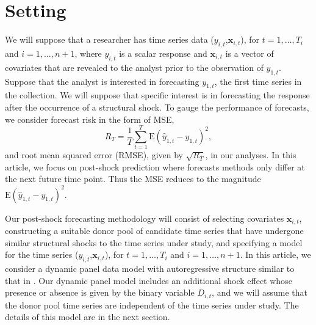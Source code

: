 \documentclass[11pt]{article}
\newcommand{\x}{\textbf{x}}
\def\E#1{\mathrm{E}(#1)} %
\theoremstyle{definition}
\begin{document}
\section{Setting}
\label{setting}

We will suppose that a researcher has time series data ($y_{i,t}$,$\x_{i,t}$), for $t = 1, \ldots,  T_i$ and $i = 1, \ldots, n+1$, where $y_{i,t}$ is a scalar response and $\x_{i,t}$ is a vector of covariates that are revealed to the analyst prior to the observation of $y_{1,t}$.  Suppose that the analyst is interested in forecasting $y_{1,t}$, the first time series in the collection. We will suppose that specific interest is in forecasting the response after the occurrence of a structural shock. To gauge the performance of forecasts, we consider forecast risk in the form of MSE,
$$
  R_T = \frac{1}{T}\sum_{t=1}^T\E{\hat y_{1,t} - y_{1,t}}^2,
$$
and root mean squared error (RMSE), given by $\sqrt{R_T}$, in our analyses. In this article, we focus on post-shock prediction where forecasts methods only differ at the next future time point. Thus the MSE reduces to the magnitude $\E{\hat y_{1,t} - y_{1,t}}^2$.


Our post-shock forecasting methodology will consist of selecting covariates $\x_{i,t}$, constructing a suitable donor pool of candidate time series that have undergone similar structural shocks to the time series under study, and specifying a model for the time series ($y_{i,t}$,$\x_{i,t}$), for $t = 1, \ldots,  T_i$ and $i = 1, \ldots, n+1$. In this article, we consider a dynamic panel data model with autoregressive structure similar to that in \citet{blundell1998initial}. Our dynamic panel model includes an additional shock effect whose presence or absence is given by the binary variable $D_{i,t}$, and we will assume that the donor pool time series are independent of the time series under study. The details of this model are in the next section.
\end{document}
